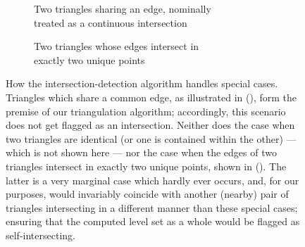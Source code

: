 \begin{figure}[htpb]
    \centering
    \begin{subfigure}[b]{0.45\textwidth}
        \centering
        \resizebox{0.9\textwidth}{!}{}
        \caption[]{Two triangles sharing an edge, nominally\\\phantom{(a) }
        treated as a continuous intersection}
        \label{fig:mollertrumbore_vertexshared}
    \end{subfigure}
    \begin{subfigure}[b]{0.45\textwidth}
        \centering
        \resizebox{0.9\textwidth}{!}{}
        \caption[]{Two triangles whose edges intersect in\\\phantom{(b) } exactly
            two unique points
        }
        \label{fig:mollertrumbore_dualisect}
    \end{subfigure}
    \caption[How the intersection-detection algorithm handles special cases]
    {How the intersection-detection algorithm handles special cases.
        Triangles which share a common edge, as illustrated in
        (), form the premise of our
        triangulation algorithm; accordingly, this scenario does not get flagged
        as an intersection. Neither does the case when two triangles are
        identical (or one is contained within the other) --- which is not shown
        here --- nor the case when the edges of two triangles intersect in
        exactly two unique points, shown in
        (). The latter is a very marginal
        case which hardly ever occurs, and, for our purposes, would invariably
        coincide with another (nearby) pair of triangles intersecting in a
        different manner than these special cases; ensuring that the computed
        level set as a whole would be flagged as self-intersecting.}
    \label{fig:mollertrumbore_specialcases}
\end{figure}

